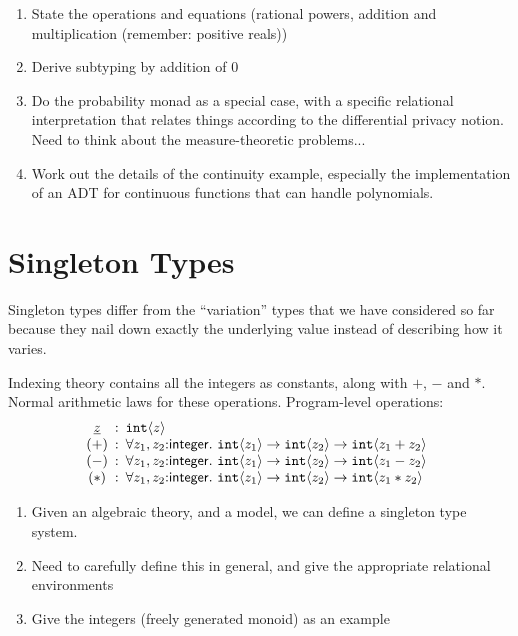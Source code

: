 \begin{enumerate}
\item State the operations and equations (rational powers, addition
  and multiplication (remember: positive reals))
\item Derive subtyping by addition of $0$
\item Do the probability monad as a special case, with a specific
  relational interpretation that relates things according to the
  differential privacy notion. Need to think about the
  measure-theoretic problems...
\item Work out the details of the continuity example, especially the
  implementation of an ADT for continuous functions that can handle
  polynomials.
\end{enumerate}

\section{Singleton Types}
\label{sec:singleton-types}

\newcommand{\Sing}{\mathit{Sing}}

Singleton types differ from the ``variation'' types that we have
considered so far because they nail down exactly the underlying value
instead of describing how it varies.

Indexing theory contains all the integers as constants, along with
$+$, $-$ and $*$. Normal arithmetic laws for these
operations. Program-level operations:
\begin{displaymath}
  \begin{array}{@{}c@{\hspace{0.5em}:\hspace{0.5em}}l}
    \underline{z} & \tyPrim{int}{z} \\ %
    (+) & \forall z_1,z_2\mathord:\mathsf{integer}.\ \tyPrim{int}{z_1} \to \tyPrim{int}{z_2} \to \tyPrim{int}{z_1 + z_2} \\
    (-) & \forall z_1,z_2\mathord:\mathsf{integer}.\ \tyPrim{int}{z_1} \to \tyPrim{int}{z_2} \to \tyPrim{int}{z_1 - z_2} \\
    (*) & \forall z_1,z_2\mathord:\mathsf{integer}.\ \tyPrim{int}{z_1} \to \tyPrim{int}{z_2} \to \tyPrim{int}{z_1 * z_2}
  \end{array}
\end{displaymath}

\begin{enumerate}
\item Given an algebraic theory, and a model, we can define a
  singleton type system.
\item Need to carefully define this in general, and give the
  appropriate relational environments
\item Give the integers (freely generated monoid) as an example
\end{enumerate}

